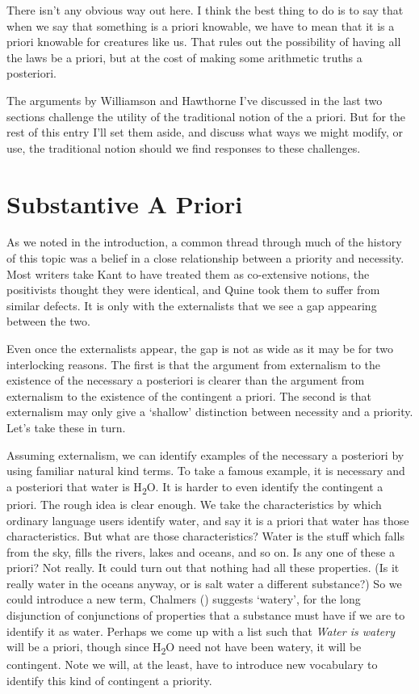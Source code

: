 \documentclass[
  10pt,
  letterpaper,
  DIV=11,
  numbers=noendperiod,
  twoside]{scrartcl}
\begin{document}
There isn't any obvious way out here. I think the best thing to do is to
say that when we say that something is a priori knowable, we have to
mean that it is a priori knowable for creatures like us. That rules out
the possibility of having all the laws be a priori, but at the cost of
making some arithmetic truths a posteriori.

The arguments by Williamson and Hawthorne I've discussed in the last two
sections challenge the utility of the traditional notion of the a
priori. But for the rest of this entry I'll set them aside, and discuss
what ways we might modify, or use, the traditional notion should we find
responses to these challenges.

\section{Substantive A Priori}\label{substantiveapriori}

As we noted in the introduction, a common thread through much of the
history of this topic was a belief in a close relationship between a
priority and necessity. Most writers take Kant to have treated them as
co-extensive notions, the positivists thought they were identical, and
Quine took them to suffer from similar defects. It is only with the
externalists that we see a gap appearing between the two.

Even once the externalists appear, the gap is not as wide as it may be
for two interlocking reasons. The first is that the argument from
externalism to the existence of the necessary a posteriori is clearer
than the argument from externalism to the existence of the contingent a
priori. The second is that externalism may only give a `shallow'
distinction between necessity and a priority. Let's take these in turn.

Assuming externalism, we can identify examples of the necessary a
posteriori by using familiar natural kind terms. To take a famous
example, it is necessary and a posteriori that water is
H\textsubscript{2}O. It is harder to even identify the contingent a
priori. The rough idea is clear enough. We take the characteristics by
which ordinary language users identify water, and say it is a priori
that water has those characteristics. But what are those
characteristics? Water is the stuff which falls from the sky, fills the
rivers, lakes and oceans, and so on. Is any one of these a priori? Not
really. It could turn out that nothing had all these properties. (Is it
really water in the oceans anyway, or is salt water a different
substance?) So we could introduce a new term, Chalmers
() suggests `watery', for the long
disjunction of conjunctions of properties that a substance must have if
we are to identify it as water. Perhaps we come up with a list such that
\emph{Water is watery} will be a priori, though since
H\textsubscript{2}O need not have been watery, it will be contingent.
Note we will, at the least, have to introduce new vocabulary to identify
this kind of contingent a priority.
\end{document}
